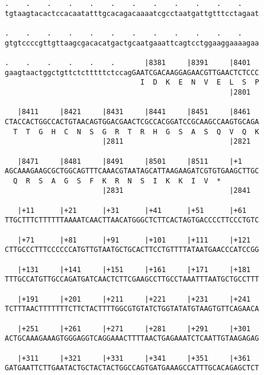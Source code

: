 \documentclass{article}
\begin{document}
\begin{Verbatim}
.    .    .    .    .    .    .    .    .    .    .    .    
tgtaagtacactccacaatatttgcacagacaaaatcgcctaatgattgtttcctagaat
                                                            
.    .    .    .    .    .    .    .    .    .    .    .    
gtgtccccgttgttaagcgacacatgactgcaatgaaattcagtcctggaaggaaaagaa
                                                            
.    .    .    .    .    .       |8381     |8391     |8401  
gaagtaactggctgttctctttttctccagGAATCGACAAGGAGAACGTTGAACTCTCCC
                                I  D  K  E  N  V  E  L  S  P
                                                     |2801  
  
   |8411     |8421     |8431     |8441     |8451     |8461  
CTACCACTGGCCACTGTAACAGTGGACGAACTCGCCACGGATCCGCAAGCCAAGTGCAGA
  T  T  G  H  C  N  S  G  R  T  R  H  G  S  A  S  Q  V  Q  K
                       |2811                         |2821  
  
   |8471     |8481     |8491     |8501     |8511     |+1    
AGCAAAGAAGCGCTGGCAGTTTCAAACGTAATAGCATTAAGAAGATCGTGTGAAGCTTGC
  Q  R  S  A  G  S  F  K  R  N  S  I  K  K  I  V  *   
                       |2831                         |2841  
  
   |+11      |+21      |+31      |+41      |+51      |+61   
TTGCTTTCTTTTTTAAAATCAACTTAACATGGGCTCTTCACTAGTGACCCCTTCCCTGTC
                                                            
   |+71      |+81      |+91      |+101     |+111     |+121  
CTTGCCCTTTCCCCCCATGTTGTAATGCTGCACTTCCTGTTTTATAATGAACCCATCCGG
                                                            
   |+131     |+141     |+151     |+161     |+171     |+181  
TTTGCCATGTTGCCAGATGATCAACTCTTCGAAGCCTTGCCTAAATTTAATGCTGCCTTT
                                                            
   |+191     |+201     |+211     |+221     |+231     |+241  
TCTTTAACTTTTTTTCTTCTACTTTTGGCGTGTATCTGGTATATGTAAGTGTTCAGAACA
                                                            
   |+251     |+261     |+271     |+281     |+291     |+301  
ACTGCAAAGAAAGTGGGAGGTCAGGAAACTTTTAACTGAGAAATCTCAATTGTAAGAGAG
                                                            
   |+311     |+321     |+331     |+341     |+351     |+361  
GATGAATTCTTGAATACTGCTACTACTGGCCAGTGATGAAAGCCATTTGCACAGAGCTCT
                                                            

\end{Verbatim}
\end{document}
